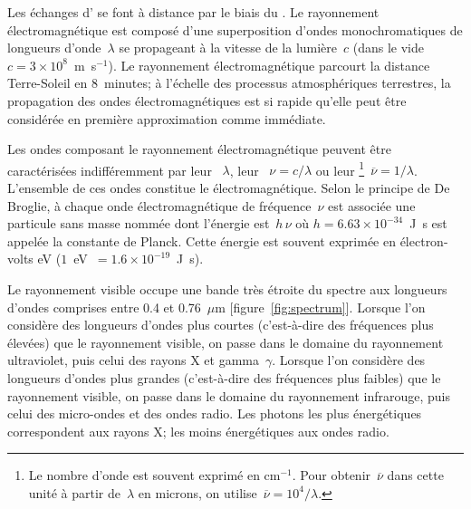 \sk
Les échanges d' se font à distance par le biais du . Le rayonnement électromagnétique est composé d'une superposition d'ondes monochromatiques de longueurs d'onde~$\lambda$ se propageant à la vitesse de la lumière~$c$ (dans le vide~$c=3 \times 10^8$~m~s$^{-1}$). Le rayonnement électromagnétique parcourt la distance Terre-Soleil en $8$~minutes; à l'échelle des processus atmosphériques terrestres, la propagation des ondes électromagnétiques est si rapide qu'elle peut être considérée en première approximation comme immédiate. 

\sk
Les ondes composant le rayonnement électromagnétique peuvent être caractérisées indifféremment par leur ~$\lambda$, leur ~$\nu = c / \lambda$ ou leur \footnote{Le nombre d'onde est souvent exprimé en cm$^{-1}$. Pour obtenir~$\overline{\nu}$ dans cette unité à partir de~$\lambda$ en microns, on utilise~$\overline{\nu} = 10^{4} / \lambda$.}~$\overline{\nu} = 1 / \lambda$. L'ensemble de ces ondes constitue le  électromagnétique. Selon le principe de De Broglie, à chaque onde électromagnétique de fréquence~$\nu$ est associée une particule sans masse nommée  dont l'énergie est~$h \, \nu$ où $h = 6.63 \times 10^{-34}$~J~s est appelée la constante de Planck. Cette énergie est souvent exprimée en électron-volts eV ($1$~eV~$= 1.6 \times 10^{-19}$~J~s).

\sk
Le rayonnement visible occupe une bande très étroite du spectre aux longueurs d'ondes comprises entre 0.4 et 0.76~$\mu$m [figure~\ref{fig:spectrum}]. Lorsque l'on considère des longueurs d'ondes plus courtes (c'est-à-dire des fréquences plus élevées) que le rayonnement visible, on passe dans le domaine du rayonnement ultraviolet, puis celui des rayons X et gamma~$\gamma$. Lorsque l'on considère des longueurs d'ondes plus grandes (c'est-à-dire des fréquences plus faibles) que le rayonnement visible, on passe dans le domaine du rayonnement infrarouge, puis celui des micro-ondes et des ondes radio. Les photons les plus énergétiques correspondent aux rayons X; les moins énergétiques aux ondes radio.

